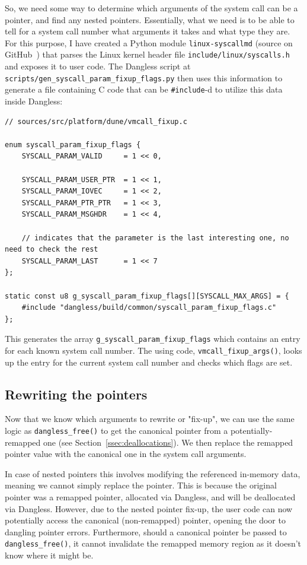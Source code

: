 So, we need some way to determine which arguments of the system call can be a pointer, and find any nested pointers. Essentially, what we need is to be able to tell for a system call number what arguments it takes and what type they are. For this purpose, I have created a Python module \texttt{linux-syscallmd} (source on GitHub~\cite{github-linux-syscallmd}) that parses the Linux kernel header file \texttt{include/linux/syscalls.h} and exposes it to user code. The Dangless script at \texttt{scripts/gen\_syscall\_param\_fixup\_flags.py} then uses this information to generate a file containing C code that can be \lstinline!#include!-d to utilize this data inside Dangless:

\begin{lstlisting}
// sources/src/platform/dune/vmcall_fixup.c

enum syscall_param_fixup_flags {
	SYSCALL_PARAM_VALID     = 1 << 0,
	
	SYSCALL_PARAM_USER_PTR  = 1 << 1,
	SYSCALL_PARAM_IOVEC     = 1 << 2,
	SYSCALL_PARAM_PTR_PTR   = 1 << 3,
	SYSCALL_PARAM_MSGHDR    = 1 << 4,
	
	// indicates that the parameter is the last interesting one, no need to check the rest
	SYSCALL_PARAM_LAST      = 1 << 7
};

static const u8 g_syscall_param_fixup_flags[][SYSCALL_MAX_ARGS] = {
	#include "dangless/build/common/syscall_param_fixup_flags.c"
};
\end{lstlisting}

This generates the array \lstinline!g_syscall_param_fixup_flags! which contains an entry for each known system call number. The using code, \lstinline!vmcall_fixup_args()!, looks up the entry for the current system call number and checks which flags are set. 

\subsection{Rewriting the pointers}

Now that we know which arguments to rewrite or "fix-up", we can use the same logic as \lstinline!dangless_free()! to get the canonical pointer from a potentially-remapped one (see Section~\ref{ssec:deallocations}). We then replace the remapped pointer value with the canonical one in the system call arguments.

In case of nested pointers this involves modifying the referenced in-memory data, meaning we cannot simply replace the pointer. This is because the original pointer was a remapped pointer, allocated via Dangless, and will be deallocated via Dangless. However, due to the nested pointer fix-up, the user code can now potentially access the canonical (non-remapped) pointer, opening the door to dangling pointer errors. Furthermore, should a canonical pointer be passed to \lstinline!dangless_free()!, it cannot invalidate the remapped memory region as it doesn't know where it might be.

